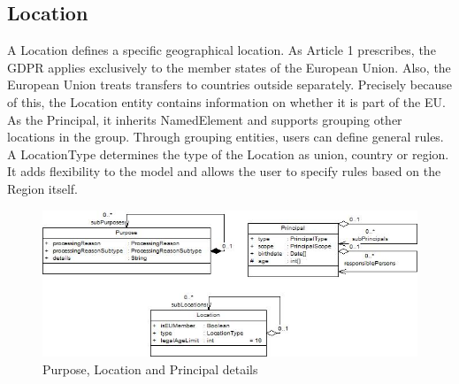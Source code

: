 \documentclass[11pt,english]{article}
\begin{document}
\subsection{Location}
A Location defines a specific geographical location. As Article 1 prescribes, the GDPR applies exclusively to the member states of the European Union. Also, the European Union treats transfers to countries outside separately. Precisely because of this, the Location entity contains information on whether it is part of the EU. As the Principal, it inherits NamedElement and supports grouping other locations in the group. Through grouping entities, users can define general rules. A LocationType determines the type of the Location as union, country or region. It adds flexibility to the model and allows the user to specify rules based on the  Region itself.
\begin{figure}[H]
    \centering
    \includegraphics[width=12.5cm]{images/purposeAndPrincipal.jpg}
    \caption{Purpose, Location and Principal details}
    \label{fig:purpose}
\end{figure}
\end{document}
